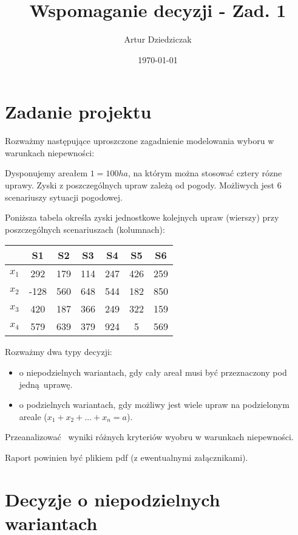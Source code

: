 \documentclass{article}
\title{Wspomaganie decyzji - Zad. 1}
\author{Artur Dziedziczak}
\date{\today}
\begin{document}
\maketitle

\section{Zadanie projektu}

Rozważmy następujące uproszczone zagadnienie modelowania wyboru w warunkach niepewności:

Dysponujemy areałem $1 = 100ha$, na którym można stosować cztery rózne uprawy. Zyski z poszczególnych upraw zależą od pogody. Możliwych jest 6 scenariuszy sytuacji pogodowej.

Poniższa tabela określa zyski jednostkowe kolejnych upraw (wierszy) przy poszczególnych scenariuszach (kolumnach):

\begin{table}[H]
  \begin{center}
    \begin{tabular}{ c |  c  c   c   c   c   c  }
      & S1 & S2 & S3 & S4 & S5 & S6 \\
      \hline
      $x_1$ & 292 & 179 & 114 & 247 & 426 & 259 \\
      $x_2$ & -128 & 560 & 648 & 544 & 182 & 850 \\
      $x_3$ & 420 & 187 & 366 & 249 & 322 & 159 \\
      $x_4$ & 579 & 639 & 379 & 924 & 5 & 569 \\
      \hline
    \end{tabular} 
  \end{center}
\end{table}

Rozważmy dwa typy decyzji:

\begin{itemize}
    \item o niepodzielnych wariantach, gdy cały areał musi być przeznaczony pod jedną uprawę.
    \item o podzielnych wariantach, gdy możliwy jest wiele upraw na podzielonym areale ($x_1 + x_2 + ... + x_n = a$).
\end{itemize}

Przeanalizować  wyniki różnych kryteriów wyobru w warunkach niepewności.

Raport powinien być plikiem pdf (z ewentualnymi załącznikami).


\section{Decyzje o niepodzielnych wariantach}
\end{document}
